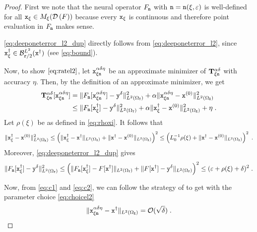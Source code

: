 \documentclass[10pt]{article}
\numberwithin{equation}{section}
\theoremstyle{nonumberplain}
\newtheorem{proof}{Proof}
\newcommand{\dom}[1]{\mathcal{D}\left(#1\right)}
\newcommand{\norms}[1]{\|#1\|}
\newcommand{\ve}{\varepsilon}
\newcommand{\X}{{\tt X}}
\newcommand{\Y}{{\tt Y}}
\newcommand{\y}{{\tt y}}
\newcommand{\n}{{\tt n}}
\newcommand{\x}{{\tt x}}
\newcommand{\xdag}{\x^\dagger}
\newcommand{\Tik}{\mathbf{T}}
\begin{document}
\begin{proof} 	
	First we note that the neural operator $F_\n$ with $\n = \n(\xi,\ve)$ is well-defined for all $\x_\xi \in M_{\xi}(\dom{F})$ because every $\x_\xi$ is continuous and therefore point evaluation in $F_\n$ makes sense.

\autoref{eq:deeponeterror_l2_dup} directly follows from \autoref{eq:deeponeterror_l2}, since $\x_\xi^\dagger \in \mathcal{B}_{{\tt r}/2}^{L^2}(\xdag)$ (see \autoref{eq:bound}).

Now, to show $\autoref{eq:ratel2}$, let $\x_{\xi\n}^{\alpha\delta\eta}$ be an approximate minimizer of $\Tik_{\xi\n}^{\alpha\delta}$ with accuracy $\eta$. Then, by the definition of an approximate minimizer, we get
        \begin{equation*}
        	\begin{aligned}
        		\Tik_{\xi\n}^{\alpha\delta}[\x_{\xi\n}^{\alpha\delta\eta}] &= \norms{F_\n[\x_{\xi\n}^{\alpha\delta\eta}] - \y^\delta}^2_{L^2(\Omega_\Y)} + \alpha\norms{\x_{\xi\n}^{\alpha\delta\eta} - \x^{(0)}}^2_{L^2(\Omega_\X)}\\
        		&\leq \norms{F_\n[\xdag_\xi] - \y^\delta}^2_{L^2(\Omega_\Y)} + \alpha\norms{\xdag_\xi - \x^{(0)}}^2_{L^2(\Omega_\X)} + \eta\;.
        	\end{aligned}
        \end{equation*}
        Let $\rho(\xi)$ be as defined in \autoref{eq:rhoxi}. It follows that
        \begin{align} \label{eq:c1}
        \norms{\xdag_\xi - \x^{(0)}}^2_{L^2(\Omega_\X)} \leq \left(\norms{\xdag_\xi - \xdag}_{L^2(\Omega_\X)} + \norms{\xdag - \x^{(0)}}_{L^2(\Omega_\X)}\right)^2 \leq \left(L_0^{-1}\rho(\xi) + \norms{\xdag - \x^{(0)}}_{L^2(\Omega_\X)} \right)^2\;.%
    \end{align}
       Moreover, \autoref{eq:deeponeterror_l2_dup} gives
\begin{align} \label{eq:c2}
		 \norms{F_\n[\xdag_\xi] - \y^\delta}^2_{L^2(\Omega_\Y)} \leq 
            \left(\norms{F_\n[\xdag_\xi] - F[\xdag]}_{L^2(\Omega_\Y)} +\norms{F[\xdag] - \y^\delta}_{L^2(\Omega_\Y)}\right)^2
            \leq (\ve + \rho(\xi) + \delta)^2\;.
\end{align} 

Now, from \autoref{eq:c1} and \autoref{eq:c2}, we can follow the strategy of \cite[Theorem 2.3a]{NeuSch90} to get with the parameter choice \autoref{eq:choicel2}
    \begin{equation} \label{eq:xi}
        	\norms{\x_{\xi\n}^{\alpha\delta\eta} - \xdag}_{L^2(\Omega_\X)} = \mathcal{O}(\sqrt{\delta})\;.
    \end{equation}
\end{proof}
\end{document}
